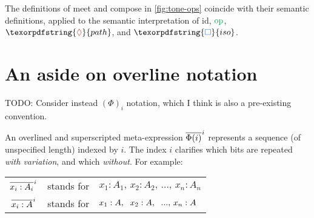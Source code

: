 \documentclass{rntz}
\newcommand{\todo}[1]{{\color{Purple}#1}}
\newcommand\opcolor{\color{ForestGreen}}
\newcommand\isocolor{\color{NavyBlue}}
\newcommand\pathcolor{\color{Bittersweet}}
\newcommand\id{\ensuremath{\mathrm{id}}}
\newcommand\op{\ensuremath{\mathrm{\opcolor op}}}
\newcommand\iso{\texorpdfstring{\ensuremath{{\isocolor\Box}}}{iso}}
\renewcommand\path{\texorpdfstring{\ensuremath{{\pathcolor\lozenge}}}{path}}
\begin{document}
\begin{conjecture}
  The definitions of meet and compose in \cref{fig:tone-ops} coincide with their
  semantic definitions, applied to the semantic interpretation of $\id$, $\op$,
  $\path$, and $\iso$.
\end{conjecture}


\section{An aside on overline notation}

\newcommand{\xbar}[2]{\overline{#2}^{\hspace{.5pt}#1}}

\newcommand{\Expr}{\Phi}
\newcommand{\Ix}[1]{#1}
\newcommand{\Ex}{{x}}
\newcommand{\Ay}{{A}}

\todo{TODO: Consider instead $\left(\Expr\right)_i$ notation, which I think is
  also a pre-existing convention.}

An overlined and superscripted meta-expression $\xbar{i}{\Expr(i)}$ represents a
sequence (of unspecified length) indexed by $i$. The index $i$ clarifies which
bits are repeated \emph{with variation}, and which \emph{without}. For example:

\begin{center}
  \begin{tabular}{ccl}
    $\xbar{\Ix{i}}{\Ex_{\Ix{i}} : \Ay_{\Ix{i}}}$
    & stands for
    & $\Ex_{\Ix{1}} : \Ay_{\Ix{1}},\, \Ex_{\Ix{2}} : \Ay_{\Ix{2}},\, ...,\, \Ex_{\Ix{n}} : \Ay_{\Ix{n}}$
    \vspace{.5em}\\
    $\xbar{\Ix{i}}{\Ex_{\Ix{i}} : \Ay}$
    & stands for
    & $\Ex_{\Ix{1}} : \Ay,\hspace{0.6em} \Ex_{\Ix{2}} : \Ay,\hspace{0.6em} ...,\, \Ex_{\Ix{n}} : \Ay$
  \end{tabular}
\end{center}
\end{document}
